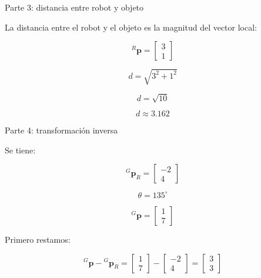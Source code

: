 \documentclass[aspectratio=169]{beamer}
\begin{document}
\begin{frame}{Parte 3: distancia entre robot y objeto}

    La distancia entre el robot y el objeto es la magnitud del vector local:

    \[
    {}^{R}\mathbf{p}
    =
    \begin{bmatrix}
        3\\
        1
    \end{bmatrix}
    \]

    \[
    d
    =
    \sqrt{3^2+1^2}
    \]

    \[
    \boxed{
        d=\sqrt{10}
    }
    \]

    \[
    \boxed{
        d\approx3.162
    }
    \]

    \vspace{0.3cm}


\end{frame}

\begin{frame}{Parte 4: transformación inversa}

    Se tiene:

    \[
    {}^{G}\mathbf{p}_R
    =
    \begin{bmatrix}
        -2\\
        4
    \end{bmatrix}
    \]

    \[
    \theta=135^\circ
    \]

    \[
    {}^{G}\mathbf{p}
    =
    \begin{bmatrix}
        1\\
        7
    \end{bmatrix}
    \]

    Primero restamos:

    \[
    {}^{G}\mathbf{p}
    -
    {}^{G}\mathbf{p}_R
    =
    \begin{bmatrix}
        1\\
        7
    \end{bmatrix}
    -
    \begin{bmatrix}
        -2\\
        4
    \end{bmatrix}
    =
    \begin{bmatrix}
        3\\
        3
    \end{bmatrix}
    \]

\end{frame}
\end{document}
